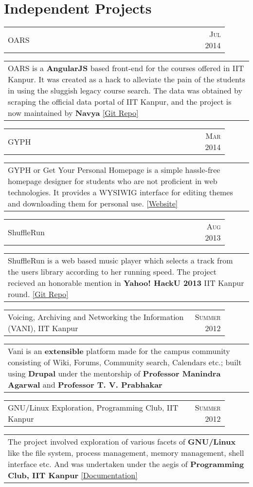 \documentclass[a4paper,10pt]{article} %
\newcommand{\sideproject}[3]{
    \begin{tabular}{p{0.9\linewidth}r}
        \textcolor{NavyBlue}{#2} & \textsc{#1}
    \end{tabular}
    \begin{tabular}{p{\linewidth}}
        \footnotesize{#3}
    \end{tabular}
    \vspace{-0.2cm}
}
\begin{document}
\section{Independent Projects}

\sideproject {Jul 2014}
             {OARS}
             {OARS is a \textbf{AngularJS} based front-end for the
              courses offered in IIT Kanpur. It was created as a
              hack to alleviate the pain of the students in using the
              sluggish legacy course search. The data was obtained by
              scraping the official data portal of IIT Kanpur, and the
              project is now maintained by \textbf{Navya}
              \href{https://github.com/navya/oars} {[Git Repo]} }

\sideproject {Mar 2014}
             {GYPH}
             {GYPH or Get Your Personal Homepage
              is a simple hassle-free homepage designer for students who are not
              proficient in web technologies. It provides a WYSIWIG
              interface for editing themes and downloading them for personal use.
              \href{http://gyph2.herokuapp.com/} {[Website]} }

\sideproject {Aug 2013}
             {ShuffleRun}
             {ShuffleRun is a web based music player which selects a track from the
              users library according to her running speed.
              The project recieved an honorable mention in \textbf{Yahoo!  HackU 2013} IIT Kanpur round.
              \href{https://github.com/srijanshetty/ShuffleRun} {[Git Repo]}}

\sideproject {Summer 2012}
             {Voicing, Archiving and Networking the Information \textsc{(VANI)}, IIT Kanpur}
             {Vani is an \textbf{extensible} platform
              made for the campus community consisting of Wiki, Forums,
              Community search, Calendars etc.; built using \textbf{Drupal}
              under the mentorship of \textbf{Professor Manindra Agarwal} and
              \textbf{Professor T. V. Prabhakar} }

\sideproject {Summer 2012}
             {GNU/Linux Exploration, Programming Club, IIT Kanpur}
             {The project involved exploration of various facets of
              \textbf{GNU/Linux} like the file system, process management,
              memory management, shell interface etc. And was
              undertaken under the aegis of \textbf{Programming Club, IIT Kanpur}
              \href{https://docs.google.com/document/d/1ZHO9w36aoq3oaZBR4Um1AOmDfiTDAEgM6baQAu3icw4/edit?usp=sharing}
              {[Documentation]} }
\end{document}
